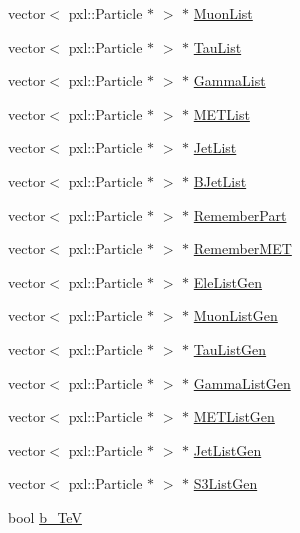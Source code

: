 \begin{DoxyCompactItemize}
vector$<$ pxl\-::\-Particle $\ast$ $>$ $\ast$ \hyperlink{classspecialAna_a6bcf2c30750671faeda4f4b38a4cfbb7}{Muon\-List}
\item 
vector$<$ pxl\-::\-Particle $\ast$ $>$ $\ast$ \hyperlink{classspecialAna_a84140461ae32bd6482b36642714d2669}{Tau\-List}
\item 
vector$<$ pxl\-::\-Particle $\ast$ $>$ $\ast$ \hyperlink{classspecialAna_ae66ed155895258a7dbbf3cc1d89a8e26}{Gamma\-List}
\item 
vector$<$ pxl\-::\-Particle $\ast$ $>$ $\ast$ \hyperlink{classspecialAna_a26e3e78376bd7d09a09d6b2db1152402}{M\-E\-T\-List}
\item 
vector$<$ pxl\-::\-Particle $\ast$ $>$ $\ast$ \hyperlink{classspecialAna_a3d7eb132203a986d49e303ba8cdd606f}{Jet\-List}
\item 
vector$<$ pxl\-::\-Particle $\ast$ $>$ $\ast$ \hyperlink{classspecialAna_a2978a50df2e166bb5475200bff24ffb2}{B\-Jet\-List}
\item 
vector$<$ pxl\-::\-Particle $\ast$ $>$ $\ast$ \hyperlink{classspecialAna_a803a475f188fbbe83b866ced8ece1442}{Remember\-Part}
\item 
vector$<$ pxl\-::\-Particle $\ast$ $>$ $\ast$ \hyperlink{classspecialAna_a3da2afad197768ff70017d2439a4ecbb}{Remember\-M\-E\-T}
\item 
vector$<$ pxl\-::\-Particle $\ast$ $>$ $\ast$ \hyperlink{classspecialAna_a8bfd838b3d91f8a0721b22b75c4078a9}{Ele\-List\-Gen}
\item 
vector$<$ pxl\-::\-Particle $\ast$ $>$ $\ast$ \hyperlink{classspecialAna_ab7b983c53e3c9bc2f4677fc76ef65fb0}{Muon\-List\-Gen}
\item 
vector$<$ pxl\-::\-Particle $\ast$ $>$ $\ast$ \hyperlink{classspecialAna_a4d474151b634aefba1f87728805d45fe}{Tau\-List\-Gen}
\item 
vector$<$ pxl\-::\-Particle $\ast$ $>$ $\ast$ \hyperlink{classspecialAna_a1e4de01edc121633e4c961284def2ef3}{Gamma\-List\-Gen}
\item 
vector$<$ pxl\-::\-Particle $\ast$ $>$ $\ast$ \hyperlink{classspecialAna_a771b064c24368a06e5de930cb48f2d36}{M\-E\-T\-List\-Gen}
\item 
vector$<$ pxl\-::\-Particle $\ast$ $>$ $\ast$ \hyperlink{classspecialAna_aaab9fa9e1d1e85bc1ff931569a709096}{Jet\-List\-Gen}
\item 
vector$<$ pxl\-::\-Particle $\ast$ $>$ $\ast$ \hyperlink{classspecialAna_a401eeadc9b34b0278c2cdf45256e9baa}{S3\-List\-Gen}
\item 
bool \hyperlink{classspecialAna_abcfabe97f1d18a464f420c1b47582338}{b\-\_\-Te\-V}

\end{DoxyCompactItemize}
